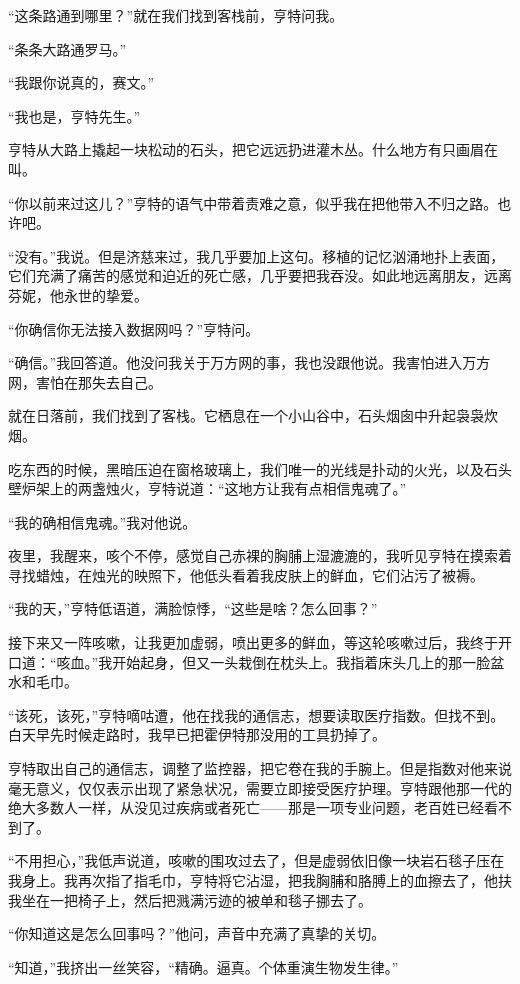 \documentclass[AutoFakeBold=true]{book}
\begin{document}
``这条路通到哪里？''就在我们找到客栈前，亨特问我。

``条条大路通罗马。''

``我跟你说真的，赛文。''

``我也是，亨特先生。''

亨特从大路上撬起一块松动的石头，把它远远扔进灌木丛。什么地方有只画眉在叫。

``你以前来过这儿？''亨特的语气中带着责难之意，似乎我在把他带入不归之路。也许吧。

``没有。''我说。但是济慈来过，我几乎要加上这句。移植的记忆汹涌地扑上表面，它们充满了痛苦的感觉和迫近的死亡感，几乎要把我吞没。如此地远离朋友，远离芬妮，他永世的挚爱。

``你确信你无法接入数据网吗？''亨特问。

``确信。''我回答道。他没问我关于万方网的事，我也没跟他说。我害怕进入万方网，害怕在那失去自己。

就在日落前，我们找到了客栈。它栖息在一个小山谷中，石头烟囱中升起袅袅炊烟。

吃东西的时候，黑暗压迫在窗格玻璃上，我们唯一的光线是扑动的火光，以及石头壁炉架上的两盏烛火，亨特说道：``这地方让我有点相信鬼魂了。''

``我的确相信鬼魂。''我对他说。

夜里，我醒来，咳个不停，感觉自己赤裸的胸脯上湿漉漉的，我听见亨特在摸索着寻找蜡烛，在烛光的映照下，他低头看着我皮肤上的鲜血，它们沾污了被褥。

``我的天，''亨特低语道，满脸惊悸，``这些是啥？怎么回事？''

接下来又一阵咳嗽，让我更加虚弱，喷出更多的鲜血，等这轮咳嗽过后，我终于开口道：``咳血。''我开始起身，但又一头栽倒在枕头上。我指着床头几上的那一脸盆水和毛巾。

``该死，该死，''亨特嘀咕遭，他在找我的通信志，想要读取医疗指数。但找不到。白天早先时候走路时，我早已把霍伊特那没用的工具扔掉了。

亨特取出自己的通信志，调整了监控器，把它卷在我的手腕上。但是指数对他来说毫无意义，仅仅表示出现了紧急状况，需要立即接受医疗护理。亨特跟他那一代的绝大多数人一样，从没见过疾病或者死亡——那是一项专业问题，老百姓已经看不到了。

``不用担心，''我低声说道，咳嗽的围攻过去了，但是虚弱依旧像一块岩石毯子压在我身上。我再次指了指毛巾，亨特将它沾湿，把我胸脯和胳膊上的血擦去了，他扶我坐在一把椅子上，然后把溅满污迹的被单和毯子挪去了。

``你知道这是怎么回事吗？''他问，声音中充满了真挚的关切。

``知道，''我挤出一丝笑容，``精确。逼真。个体重演生物发生律。''
\end{document}
